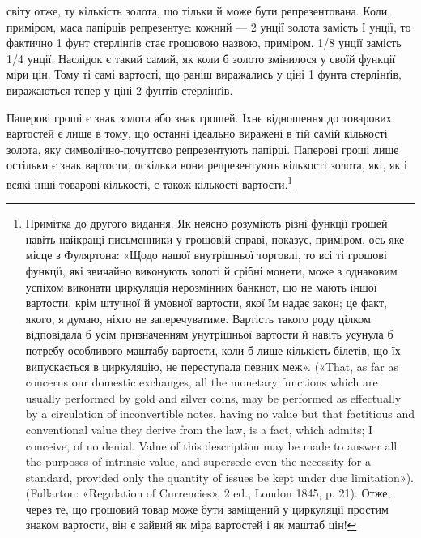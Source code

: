 \parcont{}  %
світу отже, ту кількість золота, що тільки й може бути репрезентована.
Коли, приміром, маса папірців репрезентує: кожний —
2 унції золота замість І унції, то фактично 1 фунт стерлінґів
стає грошовою назвою, приміром, 1/8 унції замість 1/4 унції.
Наслідок є такий самий, як коли б золото змінилося у своїй
функції міри цін. Тому ті самі вартості, що раніш виражались
у ціні 1 фунта стерлінґів, виражаються тепер у ціні 2 фунтів
стерлінґів.

Паперові гроші є знак золота або знак грошей. Їхнє відношення
до товарових вартостей є лише в тому, що останні ідеально виражені
в тій самій кількості золота, яку символічно-почуттєво
репрезентують папірці. Паперові гроші лише остільки є знак
вартости, оскільки вони репрезентують кількості золота, які,
як і всякі інші товарові кількості, є також кількості вартости.\footnote{
Примітка до другого видання. Як неясно розуміють різні функції
грошей навіть найкращі письменники у грошовій справі, показує, приміром,
ось яке місце з Фуляртона: «Щодо нашої внутрішньої торговлі, то
всі ті грошові функції, які звичайно виконують золоті й срібні монети,
може з однаковим успіхом виконати циркуляція нерозмінних банкнот,
що не мають іншої вартости, крім штучної й умовної вартости, якої їм
надає закон; це факт, якого, я думаю, ніхто не заперечуватиме. Вартість
такого роду цілком відповідала б усім призначенням унутрішньої вартости
й навіть усунула б потребу особливого маштабу вартости, коли б лише
кількість білетів, що їх випускається в циркуляцію, не переступала
певних меж». («That, as far as concerns our domestic exchanges, all the
monetary functions which are usually performed by gold and silver coins,
may be performed as effectually by a circulation of inconvertible notes,
having no value but that factitious and conventional value they derive
from the law, is a fact, which admits; I conceive, of no denial. Value of
this description may be made to answer all the purposes of intrinsic value,
and supersede even the necessity for a standard, provided only the quantity
of issues be kept under due limitation»). (Fullarton: «Regulation of
Currencies», 2 ed., London 1845, p. 21). Отже, через те, що грошовий
товар може бути заміщений у циркуляції простим знаком вартости, він
є зайвий як міра вартостей і як маштаб цін!
}

